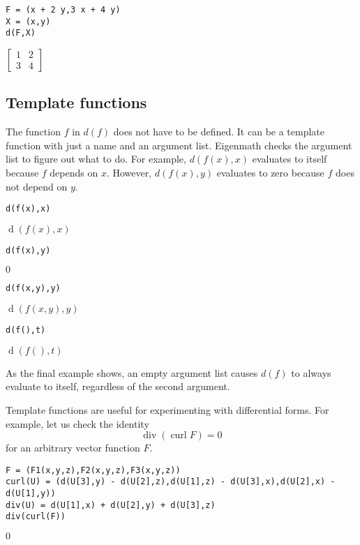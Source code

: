 {\color{blue}
\begin{verbatim}
F = (x + 2 y,3 x + 4 y)
X = (x,y)
d(F,X)
\end{verbatim}
}

\noindent
$\begin{bmatrix}1&2\\3&4\end{bmatrix}$

\subsection{Template functions}

The function $f$ in $d(f)$ does not have to be defined.
It can be a template function with just a name and an argument list.
Eigenmath checks the argument list to figure out what to do.
For example, $d(f(x),x)$ evaluates to itself because $f$ depends on $x$.
However, $d(f(x),y)$ evaluates to zero because $f$ does not depend on $y$.

{\color{blue}
\begin{verbatim}
d(f(x),x)
\end{verbatim}
}

\noindent
$\operatorname{d}(f(x),x)$

{\color{blue}
\begin{verbatim}
d(f(x),y)
\end{verbatim}
}

\noindent
$0$

{\color{blue}
\begin{verbatim}
d(f(x,y),y)
\end{verbatim}
}

\noindent
$\operatorname{d}(f(x,y),y)$

{\color{blue}
\begin{verbatim}
d(f(),t)
\end{verbatim}
}

\noindent
$\operatorname{d}(f(),t)$

\bigskip
\noindent
As the final example shows, an empty argument list causes
$d(f)$ to always evaluate to itself, regardless
of the second argument.

\bigskip
\noindent
Template functions are useful for experimenting with differential forms.
For example, let us check the identity
$$\operatorname{div}(\operatorname{curl}{F})=0$$
for an arbitrary vector function $F$.

{\color{blue}
\begin{verbatim}
F = (F1(x,y,z),F2(x,y,z),F3(x,y,z))
curl(U) = (d(U[3],y) - d(U[2],z),d(U[1],z) - d(U[3],x),d(U[2],x) - d(U[1],y))
div(U) = d(U[1],x) + d(U[2],y) + d(U[3],z)
div(curl(F))
\end{verbatim}
}

\noindent
$0$
